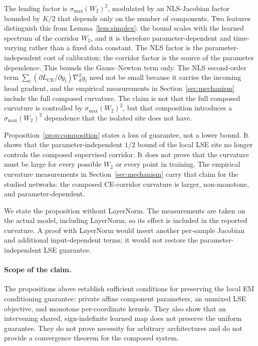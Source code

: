 The leading factor is $\sigma_{\max}(W_2)^2$, modulated by an NLS-Jacobian
factor bounded by $K/2$ that depends only on the number of components. Two
features distinguish this from Lemma~\ref{lem:simplex}: the bound scales with
the learned spectrum of the corridor $W_2$, and it is therefore
parameter-dependent and time-varying rather than a fixed data constant. The
NLS factor is the parameter-independent cost of calibration; the corridor
factor is the source of the parameter dependence. This bounds the
Gauss--Newton term only. The NLS second-order term
$\sum_l(\partial L_{\mathrm{CE}}/\partial y_l)\nabla_d^2 y_l$ need not be
small because it carries the incoming head gradient, and the empirical
measurements in Section~\ref{sec:mechanism} include the full composed
curvature. The claim is not that the full composed curvature is controlled by
$\sigma_{\max}(W_2)^2$, but that composition introduces a
$\sigma_{\max}(W_2)^2$ dependence that the isolated site does not have.

Proposition~\ref{prop:composition} states a loss of guarantee, not a lower
bound. It shows that the parameter-independent $1/2$ bound of the local LSE
site no longer controls the composed supervised corridor. It does not prove
that the curvature must be large for every possible $W_2$ or every point in
training. The empirical curvature measurements in Section~\ref{sec:mechanism}
carry that claim for the studied networks: the composed CE-corridor curvature
is larger, non-monotone, and parameter-dependent.

We state the proposition without LayerNorm. The measurements are taken on the
actual model, including LayerNorm, so its effect is included in the reported
curvature. A proof with LayerNorm would insert another per-sample Jacobian and
additional input-dependent terms; it would not restore the
parameter-independent LSE guarantee.

\paragraph{Scope of the claim.}
The propositions above establish sufficient conditions for preserving the
local EM conditioning guarantee: private affine component parameters, an
unmixed LSE objective, and monotone per-coordinate kernels. They also show
that an intervening shared, sign-indefinite learned map does not preserve the
uniform guarantee. They do not prove necessity for arbitrary architectures and
do not provide a convergence theorem for the composed system.

